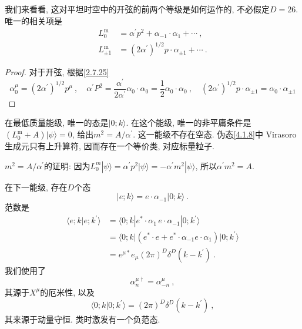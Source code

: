 我们来看看, 这对平坦时空中的开弦的前两个等级是如何运作的, 不必假定$D=26$. 唯一的相关项是
\begin{subequations} \label{4.1.11}
\begin{align}
L_{0}^{\mathrm{m}}&=\alpha^{\prime} p^{2}+\alpha_{-1} \cdot \alpha_{1}+\cdots \:, \label{4.1.11a} \\
L_{\pm 1}^{\mathrm{m}}&= (2 \alpha^{\prime})^{1 / 2} p \cdot \alpha_{\pm 1}+\cdots \:. \label{4.1.11b}
\end{align}
\end{subequations}
\begin{tcolorbox}
	\begin{proof}	对于开弦, 根据\eqref{2.7.25}
\[
\alpha_{0}^{\mu}=(2 \alpha^{\prime})^{1 / 2} p^{\mu} \:,\quad 
\alpha^{\prime} P^{2}=\frac{\alpha^{\prime}}{2 \alpha^{\prime}} \alpha_{0} \cdot \alpha_{0}=\frac{1}{2} \alpha_{0} \cdot \alpha_{0} \:, \quad 
(2 \alpha^{\prime})^{1 / 2} p \cdot \alpha_{\pm 1}=\alpha_{0} \cdot \alpha_{\pm 1}
\]
\end{proof}
\end{tcolorbox}

在最低质量能级, 唯一的态是$\lvert 0 ; k \rangle $. 在这个能级, 唯一的非平庸条件是$(L_{0}^{\mathrm{m}}+A)|\psi\rangle=0$, 给出$m^{2}=A / \alpha^{\prime}$.  
这一能级不存在空态.  伪态\eqref{4.1.8}中 Virasoro生成元只有上升算符, 因而存在一个等价类, 对应标量粒子.

\begin{tcolorbox}
	\begin{remark}
		$m^{2}=A / \alpha^{\prime} $的证明: 因为$L_{0}^{m}|\psi\rangle=\alpha^{\prime} p^{2} \lvert \psi\rangle=-\alpha^{\prime} m^{2}|\psi\rangle$, 
		所以$\alpha^{\prime} m^{2}=A$.
	\end{remark}
\end{tcolorbox}

在下一能级, 存在$D$个态
\begin{equation}
|e ; k\rangle=e \cdot \alpha_{-1}|0 ; k\rangle \:. \label{4.1.12}
\end{equation}
范数是
\begin{align}
\langle e ; k \vert e ; k^{\prime}\rangle &= \langle 0 ; k |e^{*} \cdot \alpha_{1}\, e \cdot \alpha_{-1}| 0 ; k^{\prime}\rangle \nonumber \\
&=\langle 0 ; k\vert (e^{*} \cdot e+e^{*} \cdot \alpha_{-1} e \cdot \alpha_{1})| 0 ; k^{\prime}\rangle  \nonumber \\
&=e^{\mu *} e_{\mu}(2 \pi)^{D} \delta^{D}(k-k^{\prime}) \:.  \label{4.1.13}
\end{align}
我们使用了
\begin{equation}
\alpha_{n}^{\mu \dagger}=\alpha_{-n}^{\mu} \:, \label{4.1.14}
\end{equation}
其源于$X^\mu$的厄米性, 以及
\begin{equation}
\langle 0 ; k \vert 0 ; k^{\prime}\rangle=(2 \pi)^{D} \delta^{D}(k-k^{\prime}) \:, \label{4.1.15}
\end{equation}
其来源于动量守恒. 类时激发有一个负范态.

